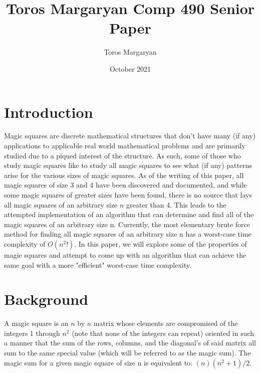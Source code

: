 \documentclass{article}
\title{Toros Margaryan Comp 490 Senior Paper}
\author{Toros Margaryan}
\date{October 2021}
\begin{document}
\maketitle

\section{Introduction}
    Magic squares are discrete mathematical structures that don't have many (if any) applications to applicable real world mathematical problems and are primarily studied due to a piqued interest of the structure. As such, some of those who study magic squares like to study all magic squares to see what (if any) patterns arise for the various sizes of magic squares. As of the writing of this paper, all magic squares of size 3 and 4 have been discovered and documented, and while some magic squares of greater sizes have been found, there is no source that lays all magic squares of an arbitrary size $n$ greater than 4. This leads to the attempted implementation of an algorithm that can determine and find all of the magic squares of an arbitrary size n. Currently, the most elementary brute force method for finding all magic squares of an arbitrary size n has a worst-case time complexity of $O(n^2!)$. In this paper, we will explore some of the properties of magic squares and attempt to come up with an algorithm that can achieve the same goal with a more "efficient" worst-case time complexity.     
\section{Background}
    A magic square is an $n$ by $n$ matrix whose elements are compromised of the integers 1 through $n^{2}$ (note that none of the integers can repeat) oriented in such a manner that  
    the sum of the rows, columns, and the diagonal's of said matrix all sum to the same special value (which will be referred to as the magic
    sum). The magic sum for a given magic square of size n is equivalent to: $(n)(n^2 + 1)/2$.
    
\end{document}
